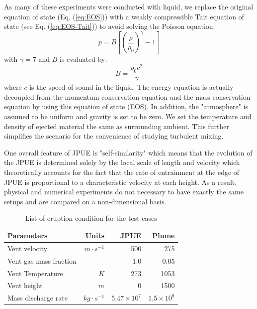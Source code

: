 As many of these experiments were conducted with liquid, we replace the original equation of state (Eq. (\ref{eq:EOS})) with a weakly compressible Tait equation of state \citep {becker2007weakly} (see Eq. (\ref{eq:EOS-Tait})) to avoid solving the Poisson equation.
\begin{equation}
p=B\left[\left(\dfrac{\rho}{\rho_0}\right)^{\gamma}-1\right]
\label{eq:EOS-Tait}
\end{equation}
with $\gamma=7$ and $B$ is evaluated by:
\begin{equation}
B=\dfrac{\rho_0 c^2}{\gamma}
\end{equation}
where $c$ is the speed of sound in the liquid. The energy equation is actually decoupled from the momentum conservation equation and the mass conservation equation by using this equation of state (EOS). In addition, the "atmosphere" is assumed to be uniform and gravity is set to be zero. We set the temperature and density of ejected material the same as surrounding ambient. This further simplifies the scenario for the convenience of studying turbulent mixing. 

One overall feature of JPUE is "self-similarity" which means that the evolution of the JPUE is determined solely by the local scale of length and velocity which theoretically accounts for the fact that the rate of entrainment at the edge of JPUE is proportional to a characteristic velocity at each height. As a result, physical and numerical experiments do not necessary to have exactly the same setups and are compared on a non-dimensional basis.

\begin{table}[htp]
\centering
	\begin{centering}
      \caption{List of eruption condition for the test cases}		
	  \begin{tabular}{lrrr}
	    \hline
	    Parameters & Units  & JPUE & Plume \\
	    \hline
	    Vent velocity          & $m\cdot s^{-1}$  & 500               & 275 \\
	    Vent gas mass fraction &                  & 1.0               & 0.05 \\
	    Vent Temperature       & $K$              & 273               & 1053 \\
	    Vent height            & $m$              & 0                 & 1500 \\
	    Mass discharge rate    & $kg\cdot s^{-1}$ & $5.47 \times 10^7$ & $1.5 \times 10^9$\\
	    \hline
	  \end{tabular}
	  \label{tab:input_parameters}
	\end{centering}
\end{table}

